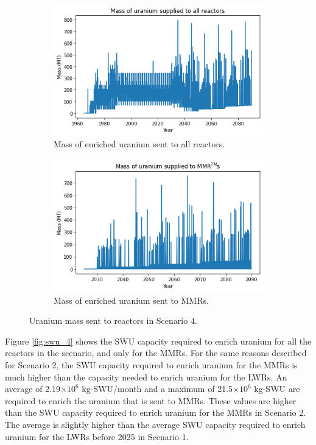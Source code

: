 \begin{figure}
    \centering
    \begin{subfigure}{0.5\textwidth}
        \centering
        \includegraphics[scale=0.5]{../figures/fuelsupply_scenarios_4.png}
        \caption{Mass of enriched uranium sent to all reactors.}
        \label{fig:totalfuel_4}
    \end{subfigure}
    \hspace{0.8cm}
    \begin{subfigure}{0.5\textwidth}
        \centering
        \includegraphics[scale=0.5]{../figures/advancedRX_fuelsupply_scenarios_4.png}
        \caption{Mass of enriched uranium sent to \glspl{MMR}.}
        \label{fig:haleu_4}
    \end{subfigure}
    \caption{Uranium mass sent to reactors in Scenario 4.}
    \label{fig:fuel_4}
\end{figure}

Figure \ref{fig:swu_4} shows the \gls{SWU} capacity required to 
enrich uranium for all the reactors in the scenario, and 
only for the \glspl{MMR}. For the same reasons described for 
Scenario 2, the \gls{SWU} capacity required to enrich uranium 
for the \glspl{MMR} is much higher than the capacity needed to 
enrich uranium for the \glspl{LWR}. An average of 2.19$\times 10^6$ 
kg-\gls{SWU}/month and a maximum of 21.5$\times 10^6$ kg-\gls{SWU}
are required to enrich the uranium that is sent to \glspl{MMR}. These values 
are higher than the \gls{SWU} 
capacity required to enrich uranium for the \glspl{MMR} in 
Scenario 2. The average is slightly higher than the average \gls{SWU} 
capacity required to enrich uranium for the \glspl{LWR} before 2025 in 
Scenario 1. 

